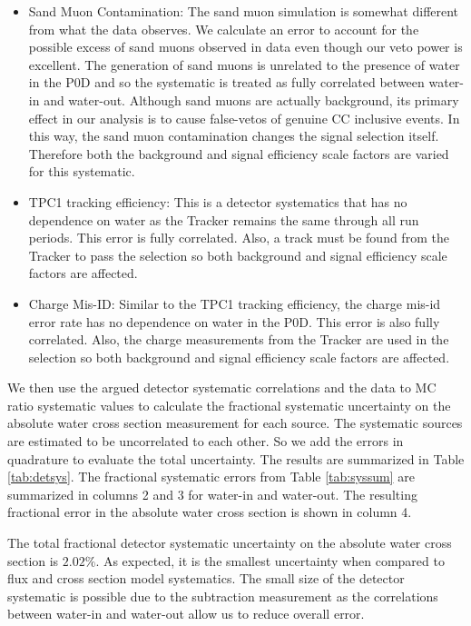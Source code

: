 \begin{itemize}
\item Sand Muon Contamination: The sand muon simulation is somewhat different from what the data observes. We calculate an error to account for the possible excess of sand muons observed in data even though our veto power is excellent. The generation of sand muons is unrelated to the presence of water in the P0D and so the systematic is treated as fully correlated between water-in and water-out. Although sand muons are actually background, its primary effect in our analysis is to cause false-vetos of genuine CC inclusive events. In this way, the sand muon contamination changes the signal selection itself. Therefore both the background and signal efficiency scale factors are varied for this systematic.
\item TPC1 tracking efficiency: This is a detector systematics that has no dependence on water as the Tracker remains the same through all run periods. This error is fully correlated. Also, a track must be found from the Tracker to pass the selection so both background and signal efficiency scale factors are affected.
\item Charge Mis-ID: Similar to the TPC1 tracking efficiency, the charge mis-id error rate has no dependence on water in the P0D. This error is also fully correlated. Also, the charge measurements from the Tracker are used in the selection so both background and signal efficiency scale factors are affected.

\end{itemize}

We then use the argued detector systematic correlations and the data to MC ratio systematic values to calculate the fractional systematic uncertainty on the absolute water cross section measurement for each source. The systematic sources are estimated to be uncorrelated to each other. So we add the errors in quadrature to evaluate the total uncertainty. The results are summarized in Table \ref{tab:detsys}. The fractional systematic errors from Table \ref{tab:syssum} are summarized in columns 2 and 3 for water-in and water-out. The resulting fractional error in the absolute water cross section is shown in column 4.

The total fractional detector systematic uncertainty on the absolute water cross section is $2.02\%$. As expected, it is the smallest uncertainty when compared to flux and cross section model systematics. The small size of the detector systematic is possible due to the subtraction measurement as the correlations between water-in and water-out allow us to reduce overall error.

